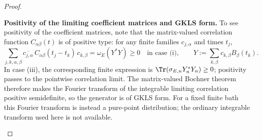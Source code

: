 \documentclass[12pt,a4paper]{article}
\begin{document}
\begin{proof}
\begin{proofsteps}
\item \textbf{Positivity of the limiting coefficient matrices and GKLS form.}
To see positivity of the coefficient matrices, note that the matrix-valued correlation function \(C_{\alpha\beta}(t)\) is of positive type:
for any finite families \(c_{j,\alpha}\) and times \(t_j\),
\[
\sum_{j,k,\alpha,\beta}
\overline{c_{j,\alpha}}\,C_{\alpha\beta}(t_j-t_k)\,c_{k,\beta}
=
\omega_E(Y^*Y)\ge 0
\quad\text{in case (i)},
\qquad
Y:=\sum_{k,\beta} c_{k,\beta}B_\beta(t_k).
\]
In case (iii), the corresponding finite expression is
\(\Tr(\sigma_{E,n}Y_n^*Y_n)\ge0\); positivity passes to the pointwise
correlation limit.
The matrix-valued Bochner theorem therefore makes the Fourier transform of
the integrable limiting correlation positive semidefinite, so the generator
is of GKLS form.  For a fixed finite bath this Fourier transform is instead
a pure-point distribution; the ordinary integrable transform used here is
not available.



\end{proofsteps}
\end{proof}
\end{document}
